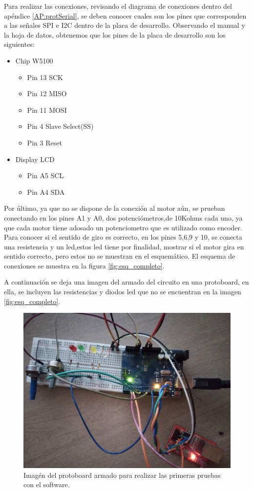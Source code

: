   
Para realizar las conexiones, revisando el diagrama de conexiones dentro del apéndice \ref{AP:protSerial}, se deben conocer cuales son los pines que corresponden a las señales SPI e I2C dentro de la placa de desarrollo. Observando el manual y la hoja de datos, obtenemos que los pines de la placa de desarrollo son los siguientes: 
\begin{itemize}
	\item Chip W5100 
	\begin{itemize}
		\item Pin 13  SCK 
		\item Pin 12  MISO 
		\item Pin 11  MOSI 
		\item Pin 4   Slave Select(SS)
		\item Pin 3   Reset 	
	\end{itemize}
	\item Display LCD   
	\begin{itemize} 
		\item Pin A5  SCL
		\item Pin A4  SDA
	\end{itemize}  
\end{itemize}  

Por último, ya que no se dispone de la conexión al motor aún, se prueban conectando en los pines A1 y A0, dos potenciómetros,de 10Kohms cada uno, ya que cada motor tiene adosado un potenciometro que es utilizado como encoder. Para conocer si el sentido de giro es correcto, en los pines 5,6,9 y 10, se conecta una resistencia y un led,estos led tiene por finalidad, mostrar si el motor gira en sentido correcto, pero estos no se muestran en el esquemático. El esquema de conexiones se muestra en la figura \ref{fig:esq_completo}. 

A continuación se deja una imagen del armado del circuito en una protoboard, en ella, se incluyen las resistencias y diodos led que no se encuentran en la imagen \ref{fig:esq_completo}. 

\begin{figure}[H]
	\centering
	\includegraphics[scale=0.08]{protoboard_1}
	\caption{Imagén del protoboard armado para realizar las primeras pruebas con el software.}
	\label{fig:proto_1}
\end{figure}

